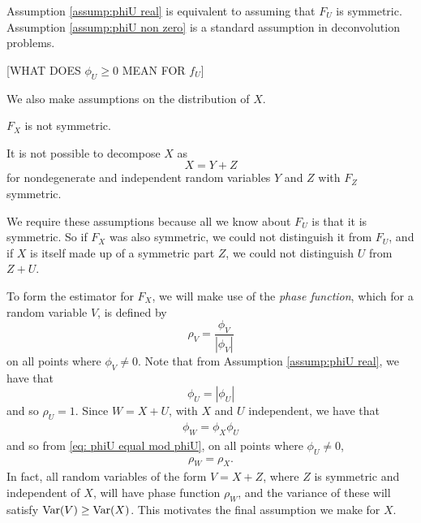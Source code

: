 	Assumption \ref{assump:phiU real} is equivalent to assuming that $F_U$ is symmetric. Assumption \ref{assump:phiU non zero} is a standard assumption in deconvolution problems.

	[WHAT DOES $\phi_U \geq 0$ MEAN FOR $f_U$]

	We also make assumptions on the distribution of $X$. 
	\begin{assumption}
	\label{assumpt: X not symmetric}
		$F_X$ is not symmetric.
	\end{assumption}
	\begin{assumption}
		\label{assump: X indecomposable}
		It is not possible to decompose $X$ as
		\begin{equation}
			X = Y + Z
		\end{equation}
		for nondegenerate and independent random variables $Y$ and $Z$ with $F_Z$ symmetric.
	\end{assumption}

	We require these assumptions because all we know about $F_U$ is that it is symmetric. So if $F_X$ was also symmetric, we could not distinguish it from $F_U$, and if $X$ is itself made up of a symmetric part $Z$, we could not distinguish $U$ from $Z+U$.


	To form the estimator for $F_X$, we will make use of the \emph{phase function}, which for a random variable $V$, is defined by
	\begin{equation}
		\rho_V = \frac{\phi_V}{|\phi_V|}
	\end{equation}
	on all points where $\phi_V \neq 0$.
	Note that from Assumption \ref{assump:phiU real}, we have that 
	\begin{equation}
	\label{eq: phiU equal mod phiU}
		\phi_U = |\phi_U|
	\end{equation}
	and so $\rho_U = 1$.
	Since $W = X+U$, with $X$ and $U$ independent, we have that
	\begin{align}
		\phi_W = \phi_X \phi_U
	\end{align}
	and so from \eqref{eq: phiU equal mod phiU}, on all points where $\phi_U \neq 0$,
	\begin{align}
		\rho_W = \rho_X.
	\end{align}
	In fact, all random variables of the form $V = X + Z$, where $Z$ is symmetric and independent of $X$, will have phase function $\rho_W$, and the variance of these will satisfy $\mathrm{Var}(V) \geq \mathrm{Var}(X)$. This motivates the final assumption we make for $X$.

